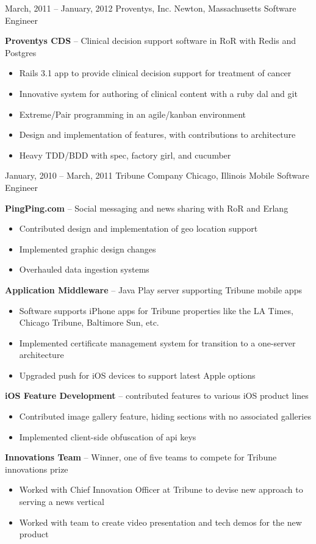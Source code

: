 \documentclass[]{friggeri-cv}
\begin{document}
\begin{entrylist}
    \entryalt
    {March, 2011 -- January, 2012}
    {Proventys, Inc.}
    {Newton, Massachusetts}
    {Software Engineer}
    {\textbf{Proventys CDS} -- Clinical decision support software in RoR with Redis and Postgres
    \begin{itemize}
      \item Rails 3.1 app to provide clinical decision support for treatment of cancer
      \item Innovative system for authoring of clinical content with a ruby dal and git
      \item Extreme/Pair programming in an agile/kanban environment
      \item Design and implementation of features, with contributions to architecture
      \item Heavy TDD/BDD with spec, factory girl, and cucumber     
    \end{itemize}}
    
    \entryalt
    {January, 2010 -- March, 2011}
    {Tribune Company}
    {Chicago, Illinois}
    {Mobile Software Engineer}
    {\textbf{PingPing.com} -- Social messaging and news sharing with RoR and Erlang
    \begin{itemize}
      \item Contributed design and implementation of geo location support
      \item Implemented graphic design changes
      \item Overhauled data ingestion systems
    \end{itemize}
    \textbf{Application Middleware} -- Java Play server supporting Tribune mobile apps
    \begin{itemize}
      \item Software supports iPhone apps for Tribune properties like the LA Times, Chicago Tribune, Baltimore Sun, etc.
      \item Implemented certificate management system for transition to a one-server architecture
      \item Upgraded push for iOS devices to support latest Apple options
    \end{itemize}
    \textbf{iOS Feature Development} -- contributed features to various iOS product lines
    \begin{itemize}
      \item Contributed image gallery feature, hiding sections with no associated galleries
      \item Implemented client-side obfuscation of api keys
    \end{itemize}
    \textbf{Innovations Team} -- Winner, one of five teams to compete for Tribune innovations prize
    \begin{itemize}
      \item Worked with Chief Innovation Officer at Tribune to devise new approach to serving a news vertical
      \item Worked with team to create video presentation and tech demos for the new product
    \end{itemize}}


\end{entrylist}
\end{document}

